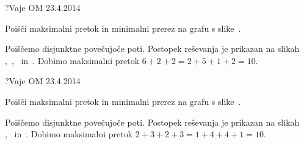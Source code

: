 \begin{naloga}{?}{Vaje OM 23.4.2014}
\begin{vprasanje}[pretok1]
Poišči maksimalni pretok in minimalni prerez na grafu s slike~\fig{}.

\begin{slika}
\pgfslika
{}
\end{slika}
\end{vprasanje}

\begin{odgovor}
Poiščemo disjunktne povečujoče poti.
Postopek reševanja je prikazan na slikah~%
,~,~ in~.
Dobimo maksimalni pretok $6+2+2 = 2+5+1+2 = 10$.

\begin{slika}
\pgfslika[pretok1a]
\end{slika}
\begin{slika}
\pgfslika[pretok1b]
\end{slika}
\begin{slika}
\pgfslika[pretok1c]
\end{slika}
\begin{slika}
\pgfslika[pretok1d]
\end{slika}
\end{odgovor}
\end{naloga}


\begin{naloga}{?}{Vaje OM 23.4.2014}
\begin{vprasanje}[pretok2]
Poišči maksimalni pretok in minimalni prerez na grafu s slike~\fig{}.

\begin{slika}
\pgfslika
{}
\end{slika}
\end{vprasanje}

\begin{odgovor}
Poiščemo disjunktne povečujoče poti.
Postopek reševanja je prikazan na slikah~%
,~ in~.
Dobimo maksimalni pretok $2+3+2+3 = 1+4+4+1 = 10$.

\begin{slika}
\pgfslika[pretok2a]
\end{slika}
\begin{slika}
\pgfslika[pretok2b]
\end{slika}
\begin{slika}
\pgfslika[pretok2c]
\end{slika}
\end{odgovor}
\end{naloga}



